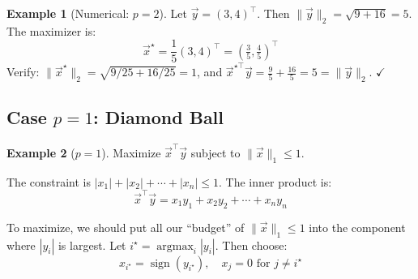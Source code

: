 \documentclass[10pt, twocolumn]{article}
\theoremstyle{definition}
\newtheorem{example}{Example}
\theoremstyle{plain}
\DeclareMathOperator{\argmax}{argmax}
\DeclareMathOperator{\sign}{sign}
\begin{document}
\begin{center}
\end{center}

\begin{example}[Numerical: $p = 2$]
Let $\vec{y} = (3, 4)^\top$. Then $\|\vec{y}\|_2 = \sqrt{9 + 16} = 5$. The maximizer is:
\[
    \vec{x}^\star = \frac{1}{5}(3, 4)^\top = \left(\tfrac{3}{5}, \tfrac{4}{5}\right)^\top
\]
Verify: $\|\vec{x}^\star\|_2 = \sqrt{9/25 + 16/25} = 1$, and $\vec{x}^{\star\top} \vec{y} = \tfrac{9}{5} + \tfrac{16}{5} = 5 = \|\vec{y}\|_2$. $\checkmark$
\end{example}

\subsection{Case $p = 1$: Diamond Ball}

\begin{example}[$p = 1$]
Maximize $\vec{x}^\top \vec{y}$ subject to $\|\vec{x}\|_1 \le 1$.
\end{example}

The constraint is $|x_1| + |x_2| + \cdots + |x_n| \le 1$. The inner product is:
\[
    \vec{x}^\top \vec{y} = x_1 y_1 + x_2 y_2 + \cdots + x_n y_n
\]

To maximize, we should put all our ``budget'' of $\|\vec{x}\|_1 \le 1$ into the component where $|y_i|$ is largest. Let $i^\star = \argmax_i |y_i|$. Then choose:
\[
    x_{i^\star} = \sign(y_{i^\star}), \quad x_j = 0 \text{ for } j \ne i^\star
\]
\end{document}
